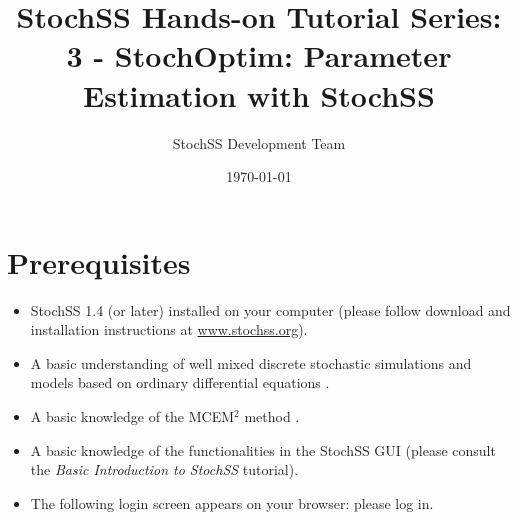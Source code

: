 \documentclass[12pt,notitlepage,nofootinbib]{revtex4}
\begin{document}
\title{StochSS Hands-on Tutorial Series: 3 - StochOptim: Parameter Estimation with StochSS}

\author{StochSS Development Team}

\date{\today}

\maketitle

\section{\label{sec:pre}Prerequisites}
\begin{itemize}
\item StochSS 1.4 (or later) installed on your computer (please follow download and installation instructions at \url{www.stochss.org}). 
\item A basic understanding of well mixed discrete stochastic simulations and models based on ordinary differential equations \cite{dan,sundials}.
\item A basic knowledge of the MCEM$^2$ method \cite{bernie,dan,caffo}. 
\item  A basic knowledge of the functionalities in the StochSS GUI (please consult the \textit{Basic Introduction to StochSS} tutorial).
\item The following login screen appears on your browser: please log in.
\end{itemize}
\end{document}
